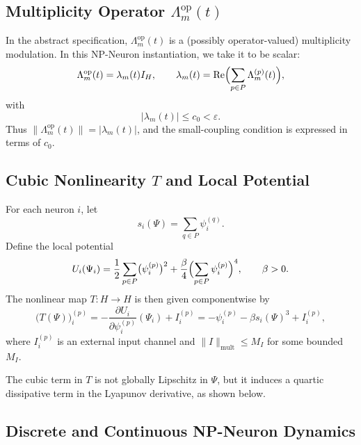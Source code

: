 \documentclass[11pt]{article}
\begin{document}
\subsection{Multiplicity Operator \(\Lambda_m^{\mathrm{op}}(t)\)}

In the abstract specification, \(\Lambda_m^{\mathrm{op}}(t)\) is a (possibly operator-valued) multiplicity modulation.
In this NP-Neuron instantiation, we take it to be scalar:
\begin{equation}
\label{eq:Lambda-operator}
\Lambda_m^{\mathrm{op}}(t)
= \lambda_m(t) I_H,
\qquad
\lambda_m(t)
= \operatorname{Re}\Bigl(\sum_{p\in P}\Lambda_m^{(p)}(t)\Bigr),
\end{equation}
with
\begin{equation}
\label{eq:lambda-bound}
|\lambda_m(t)| \le c_0 < \varepsilon.
\end{equation}
Thus \(\|\Lambda_m^{\mathrm{op}}(t)\| = |\lambda_m(t)|\), and the small-coupling condition is expressed in terms of \(c_0\).

\subsection{Cubic Nonlinearity \(T\) and Local Potential}

For each neuron \(i\), let
\[
s_i(\Psi) = \sum_{q\in P} \psi_i^{(q)}.
\]
Define the local potential
\begin{equation}
\label{eq:local-potential}
U_i(\Psi_i)
= \frac12 \sum_{p\in P}\bigl(\psi_i^{(p)}\bigr)^2
+ \frac{\beta}{4}\Bigl(\sum_{p\in P}\psi_i^{(p)}\Bigr)^4,
\qquad \beta > 0.
\end{equation}
The nonlinear map \(T:H\to H\) is then given componentwise by
\begin{equation}
\label{eq:T-definition}
\bigl(T(\Psi)\bigr)_i^{(p)}
= -\frac{\partial U_i}{\partial \psi_i^{(p)}}(\Psi_i)
+ I_i^{(p)}
= -\psi_i^{(p)} - \beta s_i(\Psi)^3 + I_i^{(p)},
\end{equation}
where \(I_i^{(p)}\) is an external input channel and \(\|I\|_{\mathrm{mult}}\le M_I\) for some bounded \(M_I\).

The cubic term in \(T\) is not globally Lipschitz in \(\Psi\), but it induces a quartic dissipative term in the Lyapunov derivative, as shown below.

\subsection{Discrete and Continuous NP-Neuron Dynamics}
\end{document}
